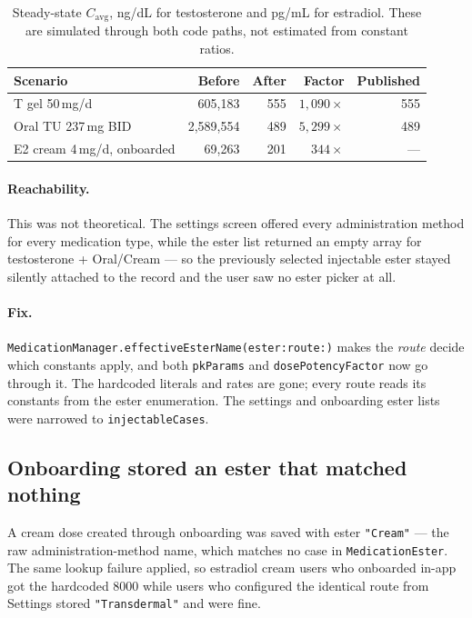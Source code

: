 \documentclass[11pt,a4paper]{article}
\newcommand{\code}[1]{\texttt{\small #1}}
\begin{document}
\begin{table}[h]
\centering
\small
\begin{tabular}{@{}lrrrr@{}}
\toprule
\textbf{Scenario} & \textbf{Before} & \textbf{After} & \textbf{Factor} & \textbf{Published} \\
\midrule
T gel 50\,mg/d & 605{,}183 & 555 & $1{,}090\times$ & 555 \\
Oral TU 237\,mg BID & 2{,}589{,}554 & 489 & $5{,}299\times$ & 489 \\
E2 cream 4\,mg/d, onboarded & 69{,}263 & 201 & $344\times$ & --- \\
\bottomrule
\end{tabular}
\caption{Steady-state $C_{\mathrm{avg}}$, ng/dL for testosterone and pg/mL for
estradiol. These are simulated through both code paths, not estimated from
constant ratios.}
\end{table}

\paragraph{Reachability.} This was not theoretical. The settings screen offered
every administration method for every medication type, while the ester list
returned an empty array for testosterone + Oral/Cream --- so the previously
selected injectable ester stayed silently attached to the record and the user saw
no ester picker at all.

\paragraph{Fix.} \code{MedicationManager.effectiveEsterName(ester:route:)} makes
the \emph{route} decide which constants apply, and both \code{pkParams} and
\code{dosePotencyFactor} now go through it. The hardcoded literals and rates are
gone; every route reads its constants from the ester enumeration. The settings
and onboarding ester lists were narrowed to \code{injectableCases}.

\subsection{Onboarding stored an ester that matched nothing}

A cream dose created through onboarding was saved with ester \code{"Cream"} ---
the raw administration-method name, which matches no case in
\code{MedicationEster}. The same lookup failure applied, so estradiol cream users
who onboarded in-app got the hardcoded 8000 while users who configured the
identical route from Settings stored \code{"Transdermal"} and were fine.
\end{document}
